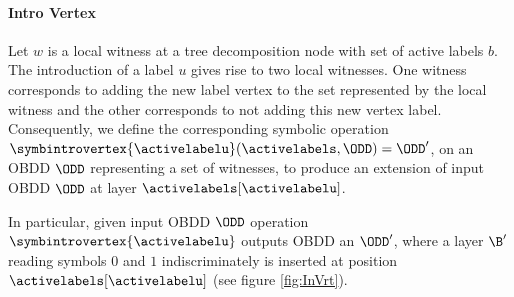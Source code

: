 \paragraph*{Intro Vertex}

Let $w$ is a local witness at a tree decomposition node with set of active labels $b$. The introduction of a label $u$ gives rise to two local witnesses. One witness corresponds to adding the new label vertex to the set represented by the local witness and the other corresponds to not adding this new vertex label. Consequently, we define the corresponding symbolic operation $\symbintrovertex{\activelabelu}(\activelabels, \ODD) = \ODD'$, on an OBDD $\ODD$ representing a set of witnesses, to produce an extension of input OBDD $\ODD$ at layer $\activelabels[\activelabelu]$.

In particular, given input OBDD $\ODD$ operation $\symbintrovertex{\activelabelu}$ outputs OBDD an $\ODD'$, where a layer $\B'$ reading symbols $0$ and $1$ indiscriminately is inserted at position $\activelabels[\activelabelu]$ (see figure \ref{fig:InVrt}). 




